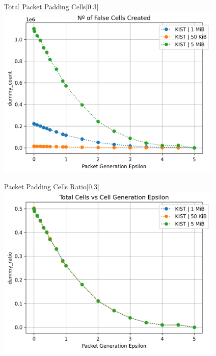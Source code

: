 \begin{figure}[htbp]
    \centering
    \begin{subcaptionbox}{Total Packet Padding Cells\label{fig:dummy_total_ppc}}[0.3\textwidth]
        {\includegraphics[width=\linewidth]{Chapters/Figures/Plots/Dummy/dummy_count_.png}}
    \end{subcaptionbox}
    \hfill
    \begin{subcaptionbox}{Packet Padding Cells Ratio\label{fig:dummy_ppc_ratio}}[0.3\textwidth]
        {\includegraphics[width=\linewidth]{Chapters/Figures/Plots/Dummy/dummy_ratio_50_kib.png}}
    \end{subcaptionbox}
    \hfill

\end{figure}
